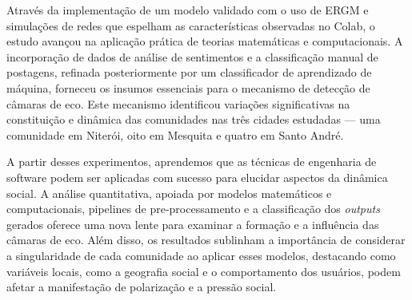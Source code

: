 Através da implementação de um modelo validado com o uso de ERGM e simulações de redes que espelham as características observadas no Colab, o estudo avançou na aplicação prática de teorias matemáticas e computacionais. A incorporação de dados de análise de sentimentos e a classificação manual de postagens, refinada posteriormente por um classificador de aprendizado de máquina, forneceu os insumos essenciais para o mecanismo de detecção de câmaras de eco. Este mecanismo identificou variações significativas na constituição e dinâmica das comunidades nas três cidades estudadas — uma comunidade em Niterói, oito em Mesquita e quatro em Santo André.

A partir desses experimentos, aprendemos que as técnicas de engenharia de software podem ser aplicadas com sucesso para elucidar aspectos da dinâmica social. A análise quantitativa, apoiada por modelos matemáticos e computacionais, pipelines de pre-processamento e a classificação dos \textit{outputs} gerados oferece uma nova lente para examinar a formação e a influência das câmaras de eco. Além disso, os resultados sublinham a importância de considerar a singularidade de cada comunidade ao aplicar esses modelos, destacando como variáveis locais, como a geografia social e o comportamento dos usuários, podem afetar a manifestação de polarização e a pressão social.